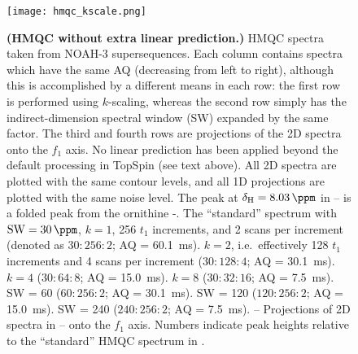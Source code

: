\begin{figure}
    \centering
    \texttt{[image: hmqc\_kscale.png]}
    {\label{fig:hmqc_kscale_std}}
    {\label{fig:hmqc_kscale_k2}}
    {\label{fig:hmqc_kscale_k4}}
    {\label{fig:hmqc_kscale_k8}}
    {\label{fig:hmqc_kscale_sw2}}
    {\label{fig:hmqc_kscale_sw4}}
    {\label{fig:hmqc_kscale_sw8}}
    {\label{fig:hmqc_kscale_std_proj}}
    {\label{fig:hmqc_kscale_k2_proj}}
    {\label{fig:hmqc_kscale_k4_proj}}
    {\label{fig:hmqc_kscale_k8_proj}}
    {\label{fig:hmqc_kscale_sw2_proj}}
    {\label{fig:hmqc_kscale_sw4_proj}}
    {\label{fig:hmqc_kscale_sw8_proj}}
    \caption{
        \textbf{(HMQC without extra linear prediction.)}
        \nitrogen{} HMQC spectra taken from NOAH-3  supersequences.
        Each column contains spectra which have the same AQ (decreasing from left to right), although this is accomplished by a different means in each row: the first row is performed using $k$-scaling, whereas the second row simply has the indirect-dimension spectral window (SW) expanded by the same factor.
        The third and fourth rows are projections of the 2D spectra onto the $f_1$ axis.
        No linear prediction has been applied beyond the default processing in TopSpin (see text above).
        All 2D spectra are plotted with the same contour levels, and all 1D projections are plotted with the same noise level.
        The peak at $\delta_{\ce{H}} = \SI{8.03}{\ppm}$ in -- is a folded peak from the ornithine \textdelta-.
        \textbf{} The ``standard'' spectrum with $\mathrm{SW} = \SI{30}{\ppm}$, $k = 1$, 256 $t_1$ increments, and 2 scans per increment (denoted as $30:256:2$; AQ = \SI{60.1}{\ms}).
        \textbf{} $k = 2$, i.e.\ effectively 128 $t_1$ increments and 4 scans per increment ($30:128:4$; AQ = \SI{30.1}{\ms}).
        \textbf{} $k = 4$ ($30:64:8$; AQ = \SI{15.0}{\ms}).
        \textbf{} $k = 8$ ($30:32:16$; AQ = \SI{7.5}{\ms}).
        \textbf{} SW = \SI{60}{\ppm} ($60:256:2$; AQ = \SI{30.1}{\ms}).
        \textbf{} SW = \SI{120}{\ppm} ($120:256:2$; AQ = \SI{15.0}{\ms}).
        \textbf{} SW = \SI{240}{\ppm} ($240:256:2$; AQ = \SI{7.5}{\ms}).
        \textbf{}--\textbf{} Projections of 2D spectra in -- onto the $f_1$ axis.
        Numbers indicate peak heights relative to the ``standard'' HMQC spectrum in .
        \grami{}
    }
    \label{fig:hmqc_kscale}
\end{figure}


